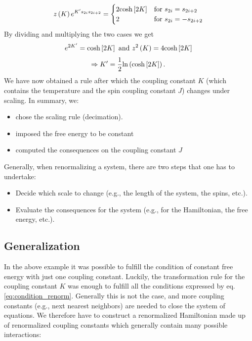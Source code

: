 \begin{equation}
z\left(K\right)e^{K's_{2i}s_{2i+2}} =\begin{cases}
  2\text{cosh}\left[2K\right]  & \text{for }s_{2i}=s_{2i+2}\\
  2  & \text{for }s_{2i}=-s_{2i+2}
\end{cases}
\label{eq:condition_renorm}
\end{equation}
By dividing and multiplying the two cases we get
$$
e^{2K'} =  \text{cosh}\left[2K\right]  \text{ and } z^2\left(K\right) =  4\text{cosh}\left[2K\right] 
$$
$$
\Rightarrow  K' =  \frac{1}{2}\text{ln}\left(   \text{cosh}\left[2K\right]   \right). 
$$
We have now obtained a rule after which the coupling constant $K$ (which contains the temperature and the spin coupling constant $J$) changes under scaling. In summary, we:
\begin{itemize}
\item chose the scaling rule (decimation).
\item imposed the free energy to be constant
\item computed the consequences on the coupling constant $J$
\end{itemize}



 Generally, when renormalizing a system, there are two steps that one has to undertake:
\begin{itemize}
\item Decide which scale to change (e.g., the length of the system, the spins, etc.).
\item Evaluate the consequences for the system (e.g., for the Hamiltonian, the free energy, etc.).
\end{itemize}




\subsection{Generalization}
\label{subsec:generalization}

In the above example it was possible to fulfill the condition of constant free energy with just one coupling constant. Luckily, the transformation rule for the coupling constant $K$ was enough to fulfill all the conditions expressed by eq. \eqref{eq:condition_renorm}. Generally this is not the case, and more coupling constants (e.g., next nearest neighbors) are needed to close the system of equations. We therefore have to construct a renormalized Hamiltonian made up of renormalized coupling constants which generally contain many possible interactions:


